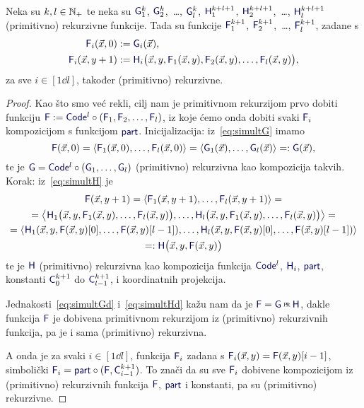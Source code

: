 \begin{propozicija}[{name=[o simultanoj rekurziji]}]\label{prop:simultrek}
    Neka su $k,l\in{\mathbb N}_+$ te neka su $\f G_1^k$, $\f G_2^k$,~\ldots, $\f G_l^k$, $\f H_1^{k+l+1}$, $\f H_2^{k+l+1}$,~\ldots, $\f H_l^{k+l+1}$ (primitivno) rekurzivne funkcije.  Tada su funkcije $\f F_1^{k+1}$, $\f F_2^{k+1}$,~\ldots, $\f F_l^{k+1}$, zadane s
\begin{align}
    \label{eq:simultG}\f F_i(\vec x,0)&:=\f G_i(\vec x)\text,\\
    \label{eq:simultH}
    \f F_i(\vec x,y+1)&:=\f H_i\bigl(\vec x,y,\f F_1(\vec x,y),\f F_2(\vec x,y),\dotsc,\f F_l(\vec x,y)\bigr)\text,
\end{align}
za sve $i\in[1\dd l]$, također (primitivno) rekurzivne.
\end{propozicija}
\begin{proof}
Kao što smo već rekli, cilj nam je primitivnom rekurzijom prvo dobiti funkciju $\f F:=\f{Code}^l\circ(\f F_1,\f F_2,\dotsc,\f F_l)$, iz koje ćemo onda dobiti svaki $\f F_i$ kompozicijom s funkcijom $\f{part}$. Inicijalizacija: iz~\eqref{eq:simultG} imamo
\begin{equation}\label{eq:simultGd}
    \f F(\vec x,0)=\langle \f F_1(\vec x,0),\dotsc,\f F_l(\vec x,0)\rangle=\langle \f G_1(\vec x),\dotsc,\f G_l(\vec x)\rangle=:\f G(\vec x)\text,
\end{equation}
te je $\f G=\f{Code}^l\circ(\f G_1,\dotsc,\f G_l)$ (primitivno) rekurzivna kao kompozicija takvih. Korak: iz~\eqref{eq:simultH} je
\begin{multline}\label{eq:simultHd}
\f F(\vec x,y+1)=\langle\f F_1(\vec x,y+1),\dotsc,\f F_l(\vec x,y+1)\rangle=\\
	=\bigl\langle\mspace{1mu}\f H_1\bigl(\vec x,y,\f F_1(\vec x,y),\dotsc,\f F_l(\vec x,y)\bigr),\dotsc,\f H_l\bigl(\vec x,y,\f F_1(\vec x,y),\dotsc,\f F_l(\vec x,y)\bigr)\bigr\rangle=\\
	=\langle\mspace{1mu}
\f H_1(\vec x,y,
\f F(\vec x,y)[0],
\dotsc,
\f F(\vec x,y)[l-1]),
\dotsc,
\f H_l(\vec x,y,
\f F(\vec x,y)[0],
\dotsc,
\f F(\vec x,y)[l-1])\rangle\\
=:\f H\bigl(\vec x,y,\f F(\vec x,y)\bigr)
\end{multline}
te je $\f H$ (primitivno) rekurzivna kao kompozicija funkcija $\f{Code}^l$, $\f H_i$, $\f{part}$, konstanti $\f C_0^{k+1}$ do $\f C_{l-1}^{k+1}$, i koordinatnih projekcija.

Jednakosti~\eqref{eq:simultGd} i~\eqref{eq:simultHd} kažu nam da je $\f F=\f G\pr\f H$, dakle funkcija $\f F$ je dobivena primitivnom rekurzijom iz (primitivno) rekurzivnih funkcija, pa je i sama (primitivno) rekurzivna.

A onda je za svaki $i\in[1\dd l]$, funkcija $\f F_i$ zadana s $\f F_i(\vec x, y)=\f F(\vec x,y)[i-1]$, simbolički $\f F_i=\f{part}\circ(\f F,\f C_{i-1}^{k+1})$. To znači da su sve $\f F_i$ dobivene kompozicijom iz (primitivno) rekurzivnih funkcija $\f F$, $\f{part}$ i konstanti, pa su (primitivno) rekurzivne.
\end{proof}


